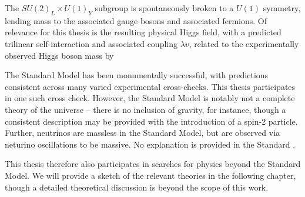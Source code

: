 The $SU(2)_{L} \times U(1)_{Y}$ subgroup is spontaneously broken to a $U(1)$ symmetry, lending mass to the
associated gauge bosons and associated fermions. Of relevance for this thesis is the resulting physical 
Higgs field, with a predicted trilinear self-interaction and associated coupling $\lambda v$, related 
to the experimentally observed Higgs boson mass by 

The Standard Model has been monumentally successful, with predictions consistent across many varied experimental cross-checks. 
This thesis participates in one such cross check. However, the Standard Model is notably not a complete theory of the 
universe -- there is no inclusion of gravity, for instance, though a consistent description may be provided with the 
introduction of a spin-2 particle. Further, neutrinos are massless in the Standard Model, but are observed via neturino
oscillations  to be massive. No explanation is provided in the Standard .


This thesis therefore also participates in searches for physics beyond the Standard Model. We will provide a sketch
of the relevant theories in the following chapter, though a detailed theoretical discussion is beyond the scope of 
this work.
